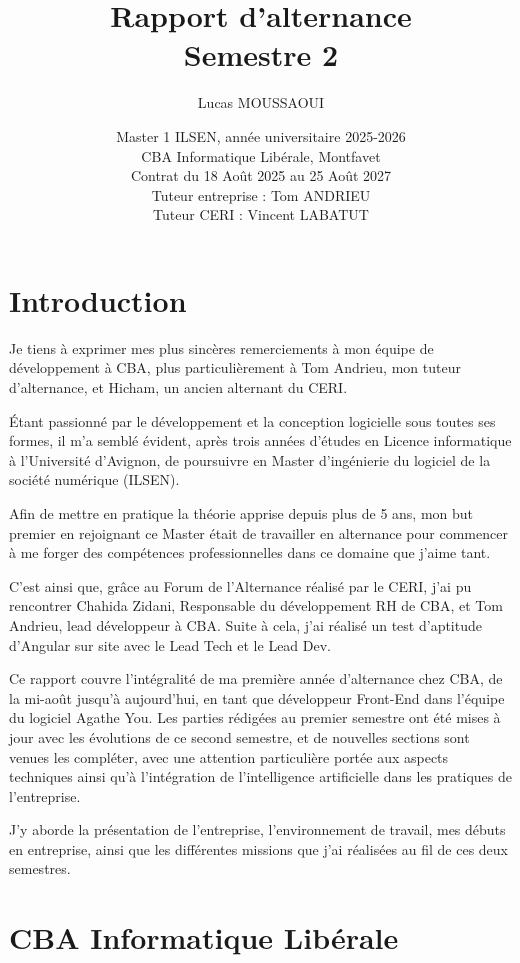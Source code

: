 \documentclass{article}
\title{
	Rapport d'alternance \\
        Semestre 2
}
\author{
	Lucas MOUSSAOUI
}
\date{
    Master 1 ILSEN, année universitaire 2025-2026\\
    CBA Informatique Libérale, Montfavet\\
    Contrat du 18 Août 2025 au 25 Août 2027\\
    Tuteur entreprise : Tom ANDRIEU\\
    Tuteur CERI : Vincent LABATUT
}
\begin{document}
\initDocument
\sloppy

\section{Introduction}

Je tiens à exprimer mes plus sincères remerciements à mon équipe de développement à CBA, plus particulièrement à Tom Andrieu, mon tuteur d'alternance, et Hicham, un ancien alternant du CERI.

Étant passionné par le développement et la conception logicielle sous toutes ses formes, il m'a semblé évident, après trois années d'études en Licence informatique à l'Université d'Avignon, de poursuivre en Master d'ingénierie du logiciel de la société numérique (ILSEN).

Afin de mettre en pratique la théorie apprise depuis plus de 5 ans, mon but premier en rejoignant ce Master était de travailler en alternance pour commencer à me forger des compétences professionnelles dans ce domaine que j'aime tant.

C'est ainsi que, grâce au Forum de l'Alternance réalisé par le CERI, j'ai pu rencontrer Chahida Zidani, Responsable du développement RH de CBA, et Tom Andrieu, lead développeur à CBA. 
Suite à cela, j'ai réalisé un test d'aptitude d'Angular sur site avec le Lead Tech et le Lead Dev.

Ce rapport couvre l'intégralité de ma première année d'alternance chez CBA, de la mi-août jusqu'à aujourd'hui, en tant que développeur Front-End dans l'équipe du logiciel Agathe You. Les parties rédigées au premier semestre ont été mises à jour avec les évolutions de ce second semestre, et de nouvelles sections sont venues les compléter, avec une attention particulière portée aux aspects techniques ainsi qu'à l'intégration de l'intelligence artificielle dans les pratiques de l'entreprise.

J'y aborde la présentation de l'entreprise, l'environnement de travail, mes débuts en entreprise, ainsi que les différentes missions que j'ai réalisées au fil de ces deux semestres.

\section{CBA Informatique Libérale}
\end{document}

